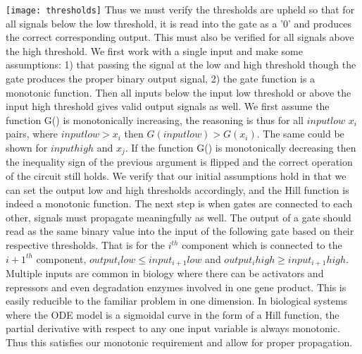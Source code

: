 \documentclass{article}
\begin{document}
\newline
\texttt{[image: thresholds]}
\newline
Thus we must verify the thresholds are upheld so that for all signals below the low threshold, it is read into the gate as a '0' and produces the correct corresponding output.  This must also be verified for all signals above the high threshold. We first work with a single input and make some assumptions:  1) that passing the signal at the low and high threshold though the gate produces the proper binary output signal, 2) the gate function is a monotonic function.  Then all inputs below the input low threshold or above the input high threshold gives valid output signals as well.  We first assume the function G() is monotonically increasing, the reasoning is thus for all $input low$ $x_i$ pairs, where $input low>x_i$ then $G(input low)>G(x_i)$.  The same could be shown for $input high$ and $x_j$.  If the function G() is monotonically decreasing then the inequality sign of the previous argument is flipped and the correct operation of the circuit still holds.  We verify that our initial assumptions hold in that we can set the output low and high thresholds accordingly, and the Hill function is indeed a monotonic function. 
\newline
The next step is when gates are connected to each other, signals must propagate meaningfully as well.  The output of a gate should read as the same binary value into the input of the following gate based on their respective thresholds.  That is for the $i^{th}$ component which is connected to the $i+1^{th}$ component, $output_i low \leq input_{i+1} low$ and $output_i high \geq input_{i+1} high$.  Multiple inputs are common in biology where there can be activators and repressors and even degradation enzymes involved in one gene product.  This is easily reducible to the familiar problem in one dimension.  In biological systems where the ODE model is a sigmoidal curve in the form of a Hill function, the partial derivative with respect to any one input variable is always monotonic.  Thus this satisfies our monotonic requirement and allow for proper propagation. %
\newline
\end{document}
